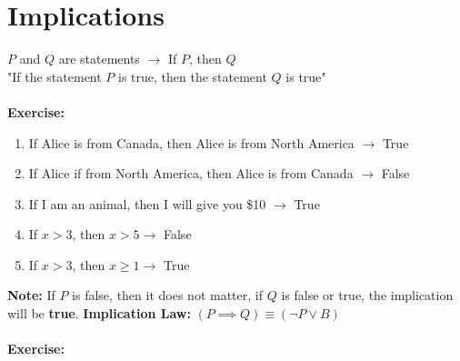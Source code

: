 \documentclass[11pt, a4paper]{memoir}
\theoremstyle{change}
\theoremstyle{plain}
\theoremstyle{nonumberplain}
\numberwithin{equation}{section}
\begin{document}
\section{Implications}
$P$ and $Q$ are statements $\to$ If $P$, then $Q$\\
"If the statement $P$ is true, then the statement $Q$ is true"\\ \: \\
\textbf{Exercise:}
\begin{enumerate}
    \item If Alice is from Canada, then Alice is from North America $\to$ True
    \item If Alice if from North America, then Alice is from Canada $\to$ False
    \item If I am an animal, then I will give you \${10} $\to$ True
    \item If $x > 3$, then $x > 5 \to$ False
    \item If $x > 3$, then $x \ge 1 \to$ True 
\end{enumerate}
\textbf{Note:} If $P$ is false, then it does not matter, if $Q$ is false or true, the implication will be \textbf{true}.
\textbf{Implication Law: } $(P \implies Q) \equiv (\neg P \vee B)$\\ \: \\
\textbf{Exercise:}
\end{document}
